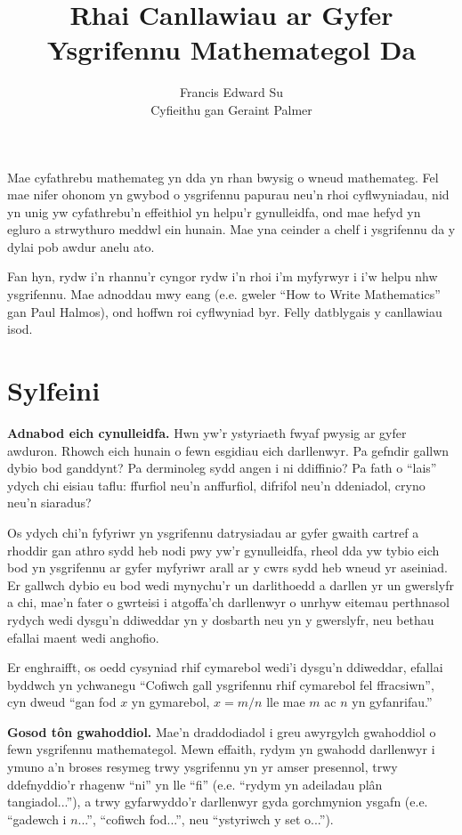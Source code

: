 \documentclass{article}
\title{Rhai Canllawiau ar Gyfer Ysgrifennu Mathemategol Da}
\author{Francis Edward Su\\\small{Cyfieithu gan Geraint Palmer}}
\date{}
\begin{document}
\maketitle

\begin{multicols}{2}

Mae cyfathrebu mathemateg yn dda yn rhan bwysig o wneud mathemateg.
Fel mae nifer ohonom yn gwybod o ysgrifennu papurau neu'n rhoi cyflwyniadau, nid
yn unig yw cyfathrebu'n effeithiol yn helpu'r gynulleidfa, ond mae hefyd yn
egluro a strwythuro meddwl ein hunain.
Mae yna ceinder a chelf i ysgrifennu da y dylai pob awdur anelu ato.

Fan hyn, rydw i'n rhannu'r cyngor rydw i'n rhoi i'm myfyrwyr i i'w helpu nhw
ysgrifennu.
Mae adnoddau mwy eang (e.e. gweler ``How to Write Mathematics'' gan Paul
Halmos), ond hoffwn roi cyflwyniad byr.
Felly datblygais y canllawiau isod.

\section*{Sylfeini}

\textbf{Adnabod eich cynulleidfa.}
Hwn yw'r ystyriaeth fwyaf pwysig ar gyfer awduron.
Rhowch eich hunain o fewn esgidiau eich darllenwyr.
Pa gefndir gallwn dybio bod ganddynt?
Pa derminoleg sydd angen i ni ddiffinio?
Pa fath o ``lais'' ydych chi eisiau taflu: ffurfiol neu'n anffurfiol, difrifol
neu'n ddeniadol, cryno neu'n siaradus?

Os ydych chi'n fyfyriwr yn ysgrifennu datrysiadau ar gyfer gwaith cartref a
rhoddir gan athro sydd heb nodi pwy yw'r gynulleidfa, rheol dda yw tybio eich
bod yn ysgrifennu ar gyfer myfyriwr arall ar y cwrs sydd heb wneud yr aseiniad.
Er gallwch dybio eu bod wedi mynychu'r un darlithoedd a darllen yr un gwerslyfr
a chi, mae'n fater o gwrteisi i atgoffa'ch darllenwyr o unrhyw eitemau
perthnasol rydych wedi dysgu'n ddiweddar yn y dosbarth neu yn y gwerslyfr, neu
bethau efallai maent wedi anghofio.

Er enghraifft, os oedd cysyniad rhif cymarebol wedi'i dysgu'n ddiweddar, efallai
byddwch yn ychwanegu ``Cofiwch gall ysgrifennu rhif cymarebol fel ffracsiwn'',
cyn dweud ``gan fod $x$ yn gymarebol, $x = m/n$ lle mae $m$ ac $n$ yn
gyfanrifau.''

\vspace{4mm}

\textbf{Gosod t\^{o}n gwahoddiol.}
Mae'n draddodiadol i greu awyrgylch gwahoddiol o fewn ysgrifennu mathemategol.
Mewn effaith, rydym yn gwahodd darllenwyr i ymuno a'n broses resymeg trwy
ysgrifennu yn yr amser presennol, trwy ddefnyddio'r rhagenw ``ni'' yn lle ``fi''
(e.e. ``rydym yn adeiladau pl\^{a}n tangiadol...''), a trwy gyfarwyddo'r
darllenwyr gyda gorchmynion ysgafn (e.e. ``gadewch i $n$...'', ``cofiwch
fod...'', neu ``ystyriwch y set o...'').


\end{multicols}
\end{document}
